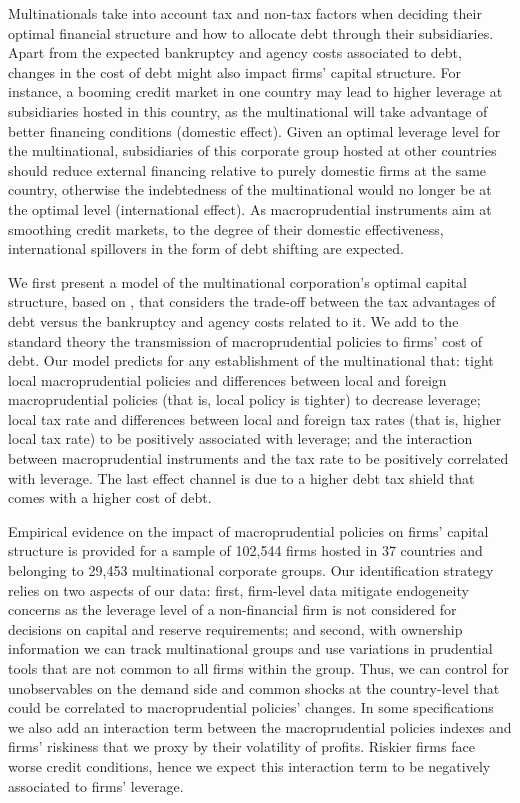 \documentclass[12pt]{article}
\begin{document}
	Multinationals take into account tax and non-tax factors when deciding their optimal financial structure and how to allocate debt through their subsidiaries. Apart from the expected bankruptcy and agency costs associated to debt, changes in the cost of debt might also impact firms' capital structure. For instance, a booming credit market in one country may lead to higher leverage at subsidiaries hosted in this country, as the multinational will take advantage of better financing conditions (domestic effect). Given an optimal leverage level for the multinational, subsidiaries of this corporate group hosted at other countries should reduce external financing relative to purely domestic firms at the same country, otherwise the indebtedness of the multinational would no longer be at the optimal level (international effect). As macroprudential instruments aim at smoothing credit markets, to the degree of their domestic effectiveness, international spillovers in the form of debt shifting are expected. 
	
	We first present a model of the multinational corporation's optimal capital structure, based on \cite*{huizinga2008capital}, that considers the trade-off between the tax advantages of debt versus the bankruptcy and agency costs related to it. We add to the standard theory the transmission of macroprudential policies to firms' cost of debt. Our model predicts for any establishment of the multinational that: tight local macroprudential policies and differences between local and foreign macroprudential policies (that is, local policy is tighter) to decrease leverage; local tax rate and differences between local and foreign tax rates (that is, higher local tax rate) to be positively associated with leverage; and the interaction between macroprudential instruments and the tax rate to be positively correlated with leverage. The last effect channel is due to a higher debt tax shield that comes with a higher cost of debt.
	
	Empirical evidence on the impact of macroprudential policies on firms' capital structure is provided for a sample of 102,544 firms hosted in 37 countries and belonging to 29,453 multinational corporate groups. Our identification strategy relies on two aspects of our data: first, firm-level data mitigate endogeneity concerns as the leverage level of a non-financial firm is not considered for decisions on capital and reserve requirements; and second, with ownership information we can track multinational groups and use variations in prudential tools that are not common to all firms within the group. Thus, we can control for unobservables on the demand side and common shocks at the country-level that could be correlated to macroprudential policies' changes. In some specifications we also add an interaction term between the macroprudential policies indexes and firms' riskiness that we proxy by their volatility of profits. Riskier firms face worse credit conditions, hence we expect this interaction term to be negatively associated to firms' leverage.
	
\end{document}
